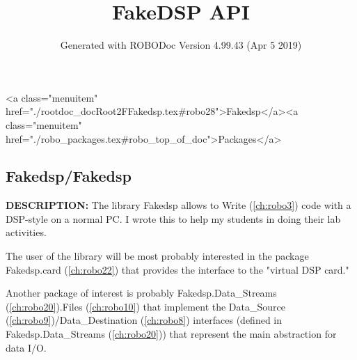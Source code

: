 \documentclass{article}
\title{FakeDSP API}
\author{Generated with ROBODoc Version 4.99.43 (Apr  5 2019)
}
\begin{document}
\maketitle
\printindex
\tableofcontents
\newpage

<a class="menuitem" href="./rootdoc_docRoot2FFakedsp.tex#robo28">Fakedsp</a><a class="menuitem" href="./robo_packages.tex#robo_top_of_doc">Packages</a>\subsection{Fakedsp/Fakedsp}
\textbf{DESCRIPTION:}\hspace{0.08in}
  The library Fakedsp allows  to Write (\ref{ch:robo3}) code with a DSP-style on a normal PC.
  I wrote this to help my students in doing their lab activities.



  The user of the library will be most probably interested in
  the package Fakedsp.card (\ref{ch:robo22}) that provides the interface to the
  "virtual DSP card."



  Another package of interest is probably Fakedsp.Data\_Streams (\ref{ch:robo20}).Files (\ref{ch:robo10})
  that implement the Data\_Source (\ref{ch:robo9})/Data\_Destination (\ref{ch:robo8}) interfaces
  (defined in Fakedsp.Data\_Streams (\ref{ch:robo20})) that represent the main abstraction
  for data I/O.
\end{document}

